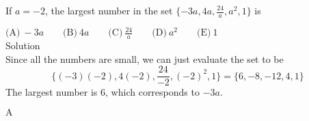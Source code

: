 

If $a = - 2$, the largest number in the set $\{ - 3a, 4a, \frac {24}{a}, a^2, 1\}$ is

$\text{(A)}\ -3a \qquad \text{(B)}\ 4a \qquad \text{(C)}\ \frac {24}{a} \qquad \text{(D)}\ a^2 \qquad \text{(E)}\ 1$
\\
Solution
\\
Since all the numbers are small, we can just evaluate the set to be \[\{ (-3)(-2), 4(-2), \frac{24}{-2}, (-2)^2, 1 \}= \{ 6, -8, -12, 4, 1 \}\]
The largest number is $6$, which corresponds to $-3a$.

$\boxed{\text{A}}$
